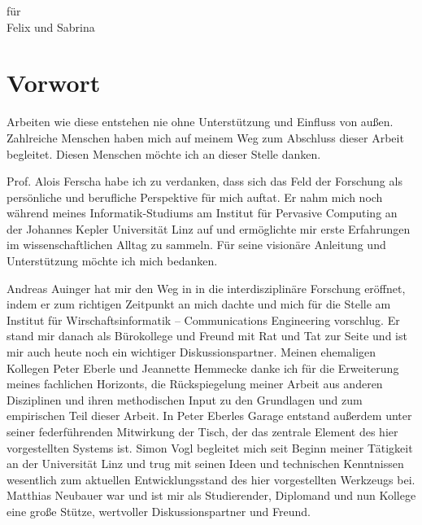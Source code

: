 \vspace*{\fill}

\begin{center}
\Large
für \\
Felix und Sabrina
\end{center}

\vspace*{\fill}

\cleardoublepage

\section*{Vorwort} %
\label{sec:vorwort}

Arbeiten wie diese entstehen nie ohne Unterstützung und Einfluss von außen. Zahlreiche Menschen haben mich auf meinem Weg zum Abschluss dieser Arbeit begleitet. Diesen Menschen möchte ich an dieser Stelle danken.

Prof. Alois Ferscha habe ich zu verdanken, dass sich das Feld der Forschung als persönliche und berufliche Perspektive für mich auftat. Er nahm mich noch während meines Informatik-Studiums am Institut für Pervasive Computing an der Johannes Kepler Universität Linz auf und ermöglichte mir erste Erfahrungen im wissenschaftlichen Alltag zu sammeln. Für seine visionäre Anleitung und Unterstützung möchte ich mich bedanken.

Andreas Auinger hat mir den Weg in in die interdisziplinäre Forschung eröffnet, indem er zum richtigen Zeitpunkt an mich dachte und mich für die Stelle am Institut für Wirschaftsinformatik -- Communications Engineering vorschlug. Er stand mir danach als Bürokollege und Freund mit Rat und Tat zur Seite und ist mir auch heute noch ein wichtiger Diskussionspartner. Meinen ehemaligen Kollegen Peter Eberle und Jeannette Hemmecke danke ich für die Erweiterung meines fachlichen Horizonts, die Rückspiegelung meiner Arbeit aus anderen Disziplinen und ihren methodischen Input zu den Grundlagen und zum empirischen Teil dieser Arbeit. In Peter Eberles Garage entstand außerdem unter seiner federführenden Mitwirkung der Tisch, der das zentrale Element des hier vorgestellten Systems ist. Simon Vogl begleitet mich seit Beginn meiner Tätigkeit an der Universität Linz und trug mit seinen Ideen und technischen Kenntnissen wesentlich zum aktuellen Entwicklungsstand des hier vorgestellten Werkzeugs bei. Matthias Neubauer war und ist mir als Studierender, Diplomand und nun Kollege eine große Stütze, wertvoller Diskussionspartner und Freund. 

